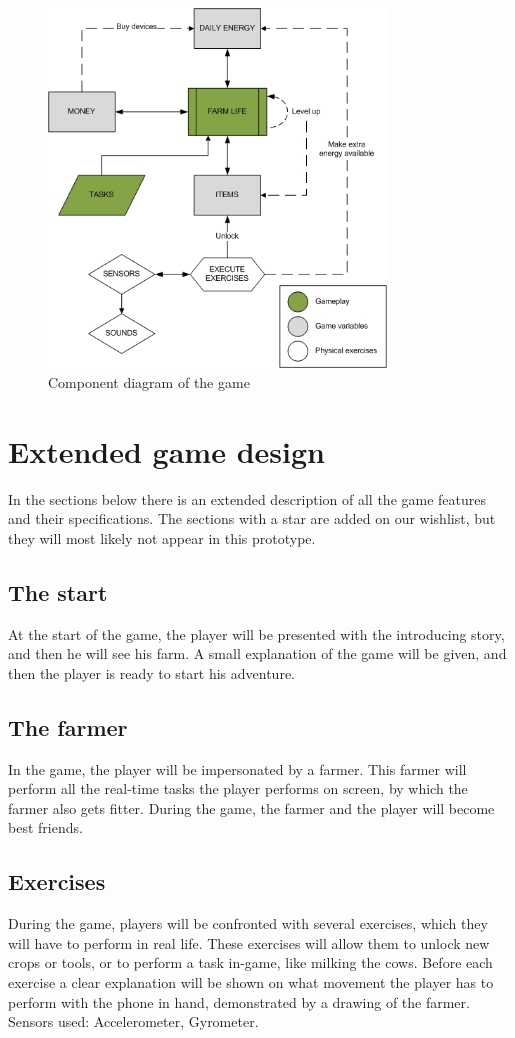 \documentclass[a4paper,11pt,notitlepage]{report}
\begin{document}
\begin{figure}[h]
	\centering
		\includegraphics[width=0.80\textwidth]{Images/gameconcept.png}
	\caption{Component diagram of the game}
	\label{fig:gameconcept}
\end{figure}

\section{Extended game design}
In the sections below there is an extended description of all the game features and their specifications. The sections with a star are added on our wishlist, but they will most likely not appear in this prototype.
\subsection{The start}
At the start of the game, the player will be presented with the introducing story, and then he will see his farm. A small explanation of the game will be given, and then the player is ready to start his adventure.
\subsection{The farmer}
In the game, the player will be impersonated by a farmer. This farmer will perform all the real-time tasks the player performs on screen, by which the farmer also gets fitter. During the game, the farmer and the player will become best friends.
\subsection{Exercises}
During the game, players will be confronted with several exercises, which they will have to perform in real life. These exercises will allow them to unlock new crops or tools, or to perform a task in-game, like milking the cows. Before each exercise a clear explanation will be shown on what movement the player has to perform with the phone in hand, demonstrated by a drawing of the farmer. Sensors used: Accelerometer, Gyrometer.
\end{document}
